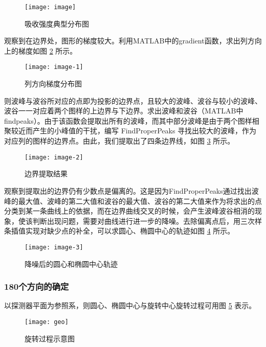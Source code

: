 \documentclass[withoutpreface,bwprint]{cumcmthesis} %
\begin{document}
      \begin{figure}[!htbp]
        \centering
        \texttt{[image: image]}
        \caption{吸收强度典型分布图}
        \label{fig:1}
      \end{figure}

      观察到在边界处，图形的梯度较大。利用MATLAB中的gradient函数，求出列方向上的梯度如图 \ref{fig:2} 所示。

      \begin{figure}[!htbp]
        \centering
        \texttt{[image: image-1]}
        \caption{列方向梯度分布图}
        \label{fig:2}
      \end{figure}

      则波峰与波谷所对应的点即为投影的边界点，且较大的波峰、波谷与较小的波峰、波谷一一对应着两个图样的上边界与下边界。求出波峰和波谷（MATLAB中findpeaks）。由于该函数会提取出所有的波峰，而其中部分波峰是由于两个图样相聚较近而产生的小峰值的干扰，编写 FindProperPeaks 寻找出较大的波峰，作为对应列的图样的边界点。由此，我们提取出了四条边界线，如图 \ref{fig:3} 所示。

      \begin{figure}[!htbp]
        \centering
        \texttt{[image: image-2]}
        \caption{边界提取结果}
        \label{fig:3}
      \end{figure}

      观察到提取出的边界仍有少数点是偏离的。这是因为FindProperPeaks通过找出波峰的最大值、波峰的第二大值和波谷的最大值、波谷的第二大值来作为将求出的点分类到某一条曲线上的依据，而在边界曲线交叉的时候，会产生波峰波谷相消的现象，使该判断出现问题，需要对曲线进行进一步的降噪。去除偏离点后，用三次样条插值\cite{uuvi}实现对缺少点的补全，可以求圆心、椭圆中心的轨迹如图 \ref{fig:4} 所示。

      \begin{figure}[!htbp]
        \centering
        \texttt{[image: image-3]}
        \caption{降噪后的圆心和椭圆中心轨迹}
        \label{fig:4}
      \end{figure}

    \subsubsection{180个方向的确定}
      以探测器平面为参照系，则圆心、椭圆中心与旋转中心旋转过程可用图 \ref{geo} 表示。

      \begin{figure}[!htbp]
        \centering
        \texttt{[image: geo]}
        \caption{旋转过程示意图}
        \label{geo}
      \end{figure}
\end{document}
